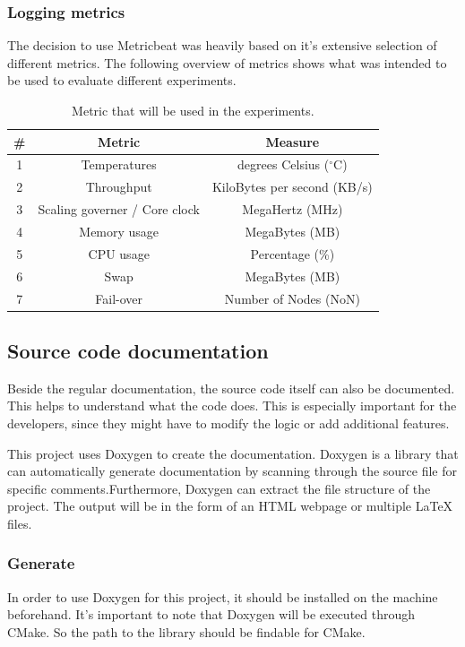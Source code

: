 \documentclass[]{article}
\begin{document}
\subsubsection{Logging metrics}
The decision to use Metricbeat was heavily based on it’s extensive selection of different metrics. The following overview of metrics shows what was intended to be used to evaluate different experiments.

\begin{table}[H]
	\begin{center}
		\begin{tabular}{ | c | c | c | }
			\hline
			\textbf{\#} & \textbf{Metric} & \textbf{Measure} \\ \hline
			
			1 & Temperatures & degrees Celsius ($^\circ$C) \\ \hline
			2 & Throughput & KiloBytes per second (KB/s) \\ \hline
			3 & Scaling governer / Core clock & MegaHertz (MHz) \\ \hline
			4 & Memory usage & MegaBytes (MB) \\ \hline
			5 & CPU usage & Percentage (\%) \\ \hline
			6 & Swap & MegaBytes (MB) \\ \hline
			7 & Fail-over & Number of Nodes (NoN)\\ \hline
		\end{tabular}
		\caption{Metric that will be used in the experiments.}
		\label{tab:metrics}
	\end{center}
\end{table}


\subsection{Source code documentation}
Beside the regular documentation, the source code itself can also be documented. This helps to understand what the code does. This is especially important for the developers, since they might have to modify the logic or add additional features.

This project uses Doxygen to create the documentation. Doxygen is a library that can automatically generate documentation by scanning through the source file for specific comments.Furthermore, Doxygen can extract the file structure of the project. The output will be in the form of an HTML webpage or multiple LaTeX files. 

\subsubsection{Generate}
In order to use Doxygen for this project, it should be installed on the machine beforehand. It’s important to note that Doxygen will be executed through CMake. So the path to the library should be findable for CMake.
\end{document}
